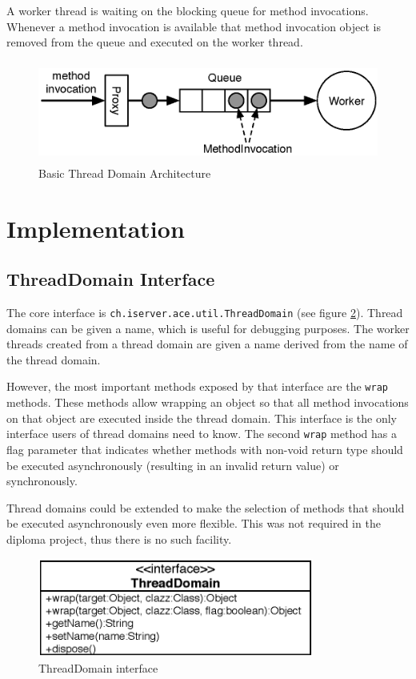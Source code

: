 A worker thread is waiting on the blocking queue for method invocations.
Whenever a method invocation is available that method invocation object
is removed from the queue and executed on the worker thread. 

\begin{figure}[H]
 \centering
 \includegraphics[width=12.7cm,height=3.32cm]{../images/finalreport/threaddomain_basic.eps}
 \caption{Basic Thread Domain Architecture}
 \label{fig:threaddomain_basic}
\end{figure}



\section{Implementation}

\subsection{ThreadDomain Interface}
The core interface is \texttt{ch.\-iserver.\-ace.\-util.\-ThreadDomain} 
(see figure \ref{fig:threaddomain_interface}). Thread domains can be given
a name, which is useful for debugging purposes. The worker threads created
from a thread domain are given a name derived from the name of the thread
domain.

However, the most important methods exposed by that interface are the 
\texttt{wrap} methods. These methods allow wrapping an object so that all 
method invocations on that object are executed inside the thread domain. This 
interface is the only interface users of thread domains need to know. The
second \texttt{wrap} method has a flag parameter that indicates whether
methods with non-void return type should be executed asynchronously (resulting
in an invalid return value) or synchronously.

Thread domains could be extended to make the selection of methods that should
be executed asynchronously even more flexible. This was not required in
the diploma project, thus there is no such facility.

\begin{figure}[H]
 \centering
 \includegraphics[width=9.07cm,height=3.25cm]{../images/finalreport/threaddomain_uml.eps}
 \caption{ThreadDomain interface}
 \label{fig:threaddomain_interface}
\end{figure}

